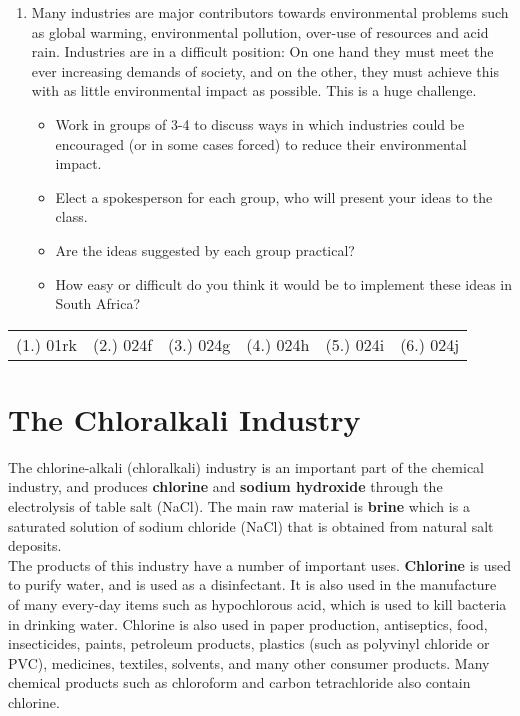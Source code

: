 {\begin{enumerate}
\item{Many industries are major contributors towards environmental problems such as global warming, environmental pollution, over-use of resources and acid rain. Industries are in a difficult position: On one hand they must meet the ever increasing demands of society, and on the other, they must achieve this with as little environmental impact as possible. This is a huge challenge.

\begin{itemize}
\item{Work in groups of 3-4 to discuss ways in which industries could be encouraged (or in some cases forced) to reduce their environmental impact.}
\item{Elect a spokesperson for each group, who will present your ideas to the class.}
\item{Are the ideas suggested by each group practical?}
\item{How easy or difficult do you think it would be to implement these ideas in South Africa?}
\end{itemize}}
\end{enumerate}

\par \practiceinfo
\par \begin{tabular}[h]{cccccc}
(1.)	01rk	&
(2.) 024f	&
(3.) 024g	&
(4.) 024h	&
(5.) 024i	&
(6.) 024j	\\
\end{tabular}
}


\section{The Chloralkali Industry}
\label{sec:chemical:chloralkali}

The chlorine-alkali (chloralkali) industry is an important part of the chemical industry, and produces \textbf{chlorine} and \textbf{sodium hydroxide} through the electrolysis of table salt (NaCl). The main raw material is \textbf{brine} which is a saturated solution of sodium chloride (NaCl) that is obtained from natural salt deposits. \\

The products of this industry have a number of important uses. \textbf{Chlorine} is used to purify water, and is used as a disinfectant. It is also used in the manufacture of many every-day items such as hypochlorous acid, which is used to kill bacteria in drinking water. Chlorine is also used in paper production, antiseptics, food, insecticides, paints, petroleum products, plastics (such as polyvinyl chloride or PVC), medicines, textiles, solvents, and many other consumer products. Many chemical products such as chloroform and carbon tetrachloride also contain chlorine.\\


